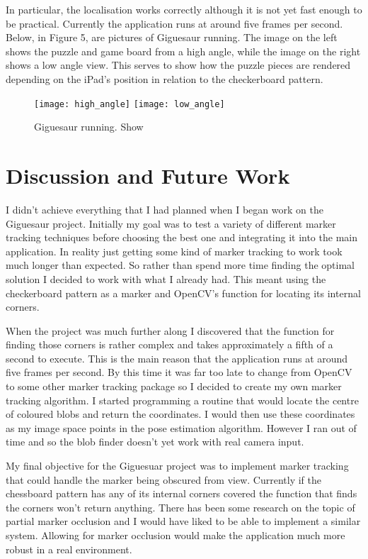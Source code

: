 \documentclass{article}
\begin{document}
In particular, the localisation works correctly although it is not yet fast enough to be practical. Currently the application runs at around five frames per second. Below, in Figure 5, are pictures of Giguesaur running. The image on the left shows the puzzle and game board from a high angle, while the image on the right shows a low angle view. This serves to show how the puzzle pieces are rendered depending on the iPad's position in relation to the checkerboard pattern. 


\begin{figure}[H]
\begin{center}
\texttt{[image: high\_angle]}
\texttt{[image: low\_angle]}
\caption{Giguesaur running. Show}
\end{center}
\end{figure}


\section{Discussion and Future Work}
I didn't achieve everything that I had planned when I began work on the Giguesaur project. Initially my goal was to test a variety of different marker tracking techniques before choosing the best one and integrating it into the main application. In reality just getting some kind of marker tracking to work took much longer than expected. So rather than spend more time finding the optimal solution I decided to work with what I already had. This meant using the checkerboard pattern as a marker and OpenCV's function for locating its internal corners. 

When the project was much further along I discovered that the function for finding those corners is rather complex and takes approximately a fifth of a second to execute. This is the main reason that the application runs at around five frames per second. By this time it was far too late to change from OpenCV to some other marker tracking package so I decided to create my own marker tracking algorithm. I started programming a routine that would locate the centre of coloured blobs and return the coordinates. I would then use these coordinates as my image space points in the pose estimation algorithm. However I ran out of time and so the blob finder doesn't yet work with real camera input. 

My final objective for the Giguesuar project was to implement marker tracking that could handle the marker being obscured from view. Currently if the chessboard pattern has any of its internal corners covered the function that finds the corners won't return anything. There has been some research on the topic of partial marker occlusion \cite{occlusion} and I would have liked to be able to implement a similar system. Allowing for marker occlusion would make the application much more robust in a real environment.
\end{document}
